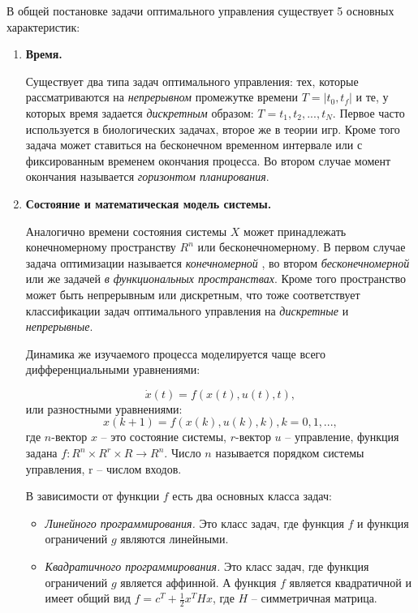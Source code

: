 В общей постановке задачи оптимального управления существует 5 основных характеристик:
\begin{enumerate}
    \item \textbf{Время.} 
    
    Существует два типа задач оптимального управления: тех, которые рассматриваются на \textit{непрерывном} промежутке времени $T=|t_0, t_f|$ и те, у которых время задается \textit{дискретным} образом: $T = {t_1, t_2, ...,t_N}$. Первое часто используется в биологических задачах, второе же в теории игр. Кроме того задача может ставиться на бесконечном временном интервале или с фиксированным временем окончания процесса. Во втором случае момент окончания называется \textit{горизонтом планирования}.
    
    \item \textbf{Состояние и математическая модель системы.} 
    
    Аналогично времени состояния системы $X$ может принадлежать конечномерному пространству $R^n$ или бесконечномерному. В первом случае задача оптимизации называется {\it конечномерной} , во втором {\it бесконечномерной} или же  задачей {\it в функциональных пространствах}. Кроме того пространство может быть непрерывным или дискретным, что тоже соответствует классификации задач оптимального управления на {\it дискретные} и {\it непрерывные}. 
    
    Динамика же изучаемого процесса моделируется чаще всего дифференциальными уравнениями: 
    
    \begin{equation} \label{eq_oc:diff}
    \dot{x}(t)=f(x(t),u(t),t),
    \end{equation}
    или разностными уравнениями: 
    \begin{equation} \label{eq_oc:razn}
    {x(k+1)}=f(x(k),u(k),k), k=0,1,...,
    \end{equation}
    где $n$-вектор $x$ -- это состояние системы, $r$-вектор $u$ -- управление, функция задана $f: R^n \times R^r \times R \rightarrow R^n$. Число $n$ называется порядком системы управления, r -- числом входов. 
    
    В зависимости от функции $f$ есть два основных класса задач:
    \begin{itemize}
    	\item  {\it Линейного программирования.} Это класс задач, где функция $f$ и функция ограничений $g$ являются линейными. 
    	\item {\it Квадратичного программирования.} Это класс задач, где функция ограничений $g$ является аффинной. А функция $f$ является квадратичной и имеет общий вид $f = c^T + \frac{1}{2} x^T H x$, где $H$ -- симметричная матрица.
    \end{itemize}
    

\end{enumerate}
